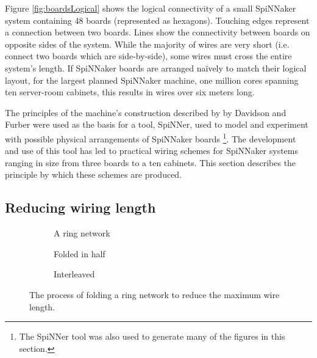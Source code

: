 		Figure \ref{fig:boardsLogical} shows the logical connectivity of a small
		SpiNNaker system containing 48 boards (represented as hexagons). Touching
		edges represent a connection between two boards. Lines show the connectivity
		between boards on opposite sides of the system. While the majority of wires
		are very short (i.e. connect two boards which are side-by-side), some wires
		must cross the entire system's length. If SpiNNaker boards are arranged
		na\"ively to match their logical layout, for the largest planned SpiNNaker
		machine, one million cores spanning ten server-room cabinets, this results
		in wires over six meters long.
		
		The principles of the machine's construction described by by Davidson
		\cite{davidsonWiring} and Furber \cite{furber13email} were used as the basis
		for a tool, SpiNNer, used to model and experiment with possible physical
		arrangements of SpiNNaker boards \footnote{The SpiNNer tool was also used to
		generate many of the figures in this section.}. The development and use of
		this tool has led to practical wiring schemes for SpiNNaker systems ranging
		in size from three boards to a ten cabinets. This section describes the
		principle by which these schemes are produced.
		
		\subsection{Reducing wiring length}
			
			\begin{figure}
				\begin{subfigure}[b]{\textwidth}
					\center
					
					\caption{A ring network}
					\label{fig:ringLong}
				\end{subfigure}
				
				\vspace{2ex}
				
				\begin{subfigure}[b]{\textwidth}
					\center
					
					\caption{Folded in half}
					\label{fig:ringFolded}
				\end{subfigure}
				
				\vspace{2ex}
				
				\begin{subfigure}[b]{\textwidth}
					\center
					
					\caption{Interleaved}
					\label{fig:ringInterleaved}
				\end{subfigure}
				
				\caption[Folding a ring network.]{The process of folding a ring network
				to reduce the maximum wire length.}
				\label{fig:folding}
			\end{figure}
			
